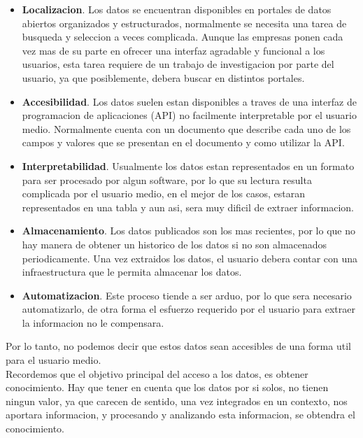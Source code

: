     \begin{itemize}
        \item \textbf{Localizacion}. Los datos se encuentran disponibles en portales de datos abiertos organizados 
        y estructurados, normalmente se necesita una tarea de busqueda y seleccion
        a veces complicada. Aunque las empresas ponen cada vez mas de su parte en ofrecer una interfaz 
        agradable y funcional a los usuarios, esta tarea requiere de un trabajo de investigacion por parte del usuario,
        ya que posiblemente, debera buscar en distintos portales.
        \item \textbf{Accesibilidad}. Los datos suelen estan disponibles a traves de una interfaz de programacion 
        de aplicaciones (API) no facilmente interpretable por el usuario medio. Normalmente cuenta con 
        un documento que describe cada uno de los campos y valores que se presentan en el documento y como utilizar la API.
        \item \textbf{Interpretabilidad}. Usualmente los datos estan representados en un formato para ser procesado por 
        algun software, por lo que su lectura resulta complicada por el usuario medio, en el mejor de los casos, 
        estaran representados en una tabla y aun asi, sera muy dificil de extraer informacion.
        \item \textbf{Almacenamiento}. Los datos publicados son los mas recientes, por lo que no hay manera de obtener 
        un historico de los datos si no son almacenados periodicamente. Una vez extraidos los datos, el usuario debera 
        contar con una infraestructura que le permita almacenar los datos.
        \item \textbf{Automatizacion}. Este proceso tiende a ser arduo, por lo que sera necesario automatizarlo, de otra 
        forma el esfuerzo requerido por el usuario para extraer la informacion no le compensara.
         
    \end{itemize}
    
Por lo tanto, no podemos decir que estos datos sean accesibles de una forma util para el usuario medio.\\

Recordemos que el objetivo principal del acceso a los datos, es obtener conocimiento. Hay que tener en 
cuenta que los datos por si solos, no tienen ningun valor, ya que carecen de sentido, una vez integrados en un contexto,
nos aportara informacion, y procesando y analizando esta informacion, se obtendra el conocimiento.\\
    
